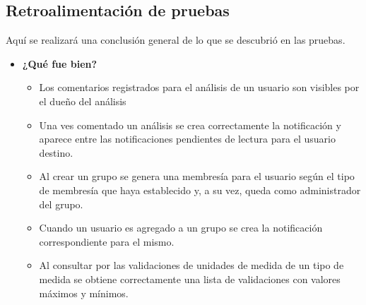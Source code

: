 \subsection{Retroalimentación de pruebas}
Aquí se realizará una conclusión general de lo que se descubrió en las pruebas.
	\begin{itemize}
		\item \textbf{¿Qué fue bien?}
        	\begin{itemize}
				\item  Los comentarios registrados para el análisis de un usuario son visibles por el dueño del análisis
				\item Una ves comentado un análisis se crea correctamente la notificación y aparece entre las notificaciones pendientes de lectura para el usuario destino.
				\item Al crear un grupo se genera una membresía para el usuario según el tipo de membresía que haya establecido y, a su vez, queda como administrador del grupo. 
				\item Cuando un usuario es agregado a un grupo se crea la notificación correspondiente para el mismo.
				\item Al consultar por las validaciones de unidades de medida de un tipo de medida se obtiene correctamente una lista de validaciones con valores máximos y mínimos.
			\end{itemize}


\end{itemize}
